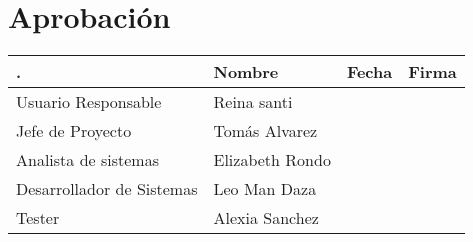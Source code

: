 \chapter*{Aprobación}
\begin{table}[h]
\centering
\begin{tabular}{llll}
\hline
.                         & Nombre          & Fecha & Firma \\ \hline
Usuario Responsable       & Reina santi     &       &       \\
Jefe de Proyecto          & Tomás Alvarez   &       &       \\
Analista de sistemas      & Elizabeth Rondo &       &       \\
Desarrollador de Sistemas & Leo Man Daza    &       &       \\
Tester                    & Alexia Sanchez  &       &       \\ \hline
\end{tabular}
\end{table}